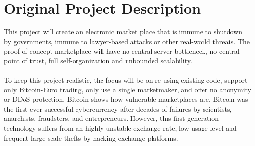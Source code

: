 \section{Original Project Description}
This project will create an electronic market place that is immune to shutdown by governments, immune to lawyer-based attacks or other real-world threats. The proof-of-concept marketplace will have no central server bottleneck, no central point of trust, full self-organization and unbounded scalability.\\
\\
To keep this project realistic, the focus will be on re-using existing code, support only Bitcoin-Euro trading, only use a single marketmaker, and offer no anonymity or DDoS protection. Bitcoin shows how vulnerable marketplaces are. Bitcoin was the first ever successful cybercurrency after decades of failures by  scientists, anarchists, fraudsters, and entrepreneurs. However, this first-generation technology suffers from an highly unstable exchange rate, low usage level and frequent large-scale thefts by hacking exchange platforms.
